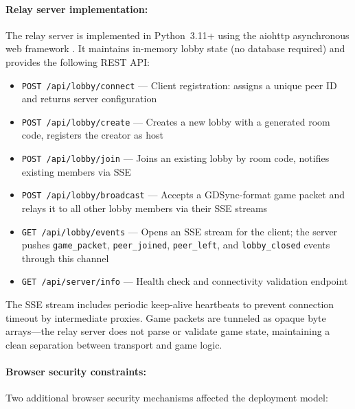 \paragraph*{Relay server implementation:}

The relay server is implemented in Python~3.11+ using the aiohttp asynchronous web framework \citep{python_org,aiohttp_docs}. It maintains in-memory lobby state (no database required) and provides the following REST API:

\begin{itemize}
    \item \texttt{POST /api/lobby/connect} --- Client registration: assigns a unique peer ID and returns server configuration
    \item \texttt{POST /api/lobby/create} --- Creates a new lobby with a generated room code, registers the creator as host
    \item \texttt{POST /api/lobby/join} --- Joins an existing lobby by room code, notifies existing members via SSE
    \item \texttt{POST /api/lobby/broadcast} --- Accepts a GDSync-format game packet and relays it to all other lobby members via their SSE streams
    \item \texttt{GET /api/lobby/events} --- Opens an SSE stream for the client; the server pushes \texttt{game\_packet}, \texttt{peer\_joined}, \texttt{peer\_left}, and \texttt{lobby\_closed} events through this channel
    \item \texttt{GET /api/server/info} --- Health check and connectivity validation endpoint
\end{itemize}

The SSE stream includes periodic keep-alive heartbeats to prevent connection timeout by intermediate proxies. Game packets are tunneled as opaque byte arrays---the relay server does not parse or validate game state, maintaining a clean separation between transport and game logic.

\paragraph*{Browser security constraints:}

Two additional browser security mechanisms affected the deployment model:

